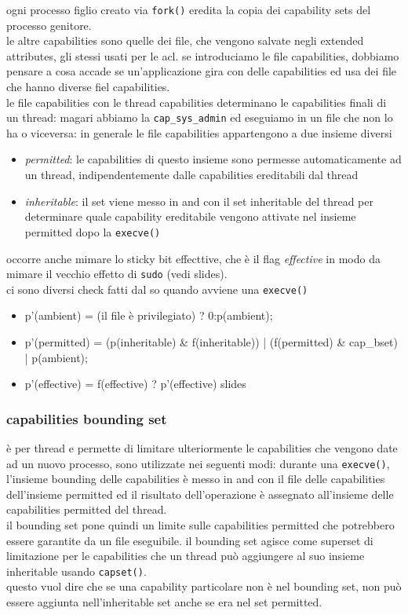 \documentclass[12pt, oneside]{extbook} %
\begin{document}
ogni processo figlio creato via \texttt{fork()} eredita la copia dei capability sets del processo genitore.\\le altre capabilities sono quelle dei file, che vengono salvate negli extended attributes, gli stessi usati per le acl. se introduciamo le file capabilities, dobbiamo pensare a cosa accade se un'applicazione gira con delle capabilities ed usa dei file che hanno diverse fiel capabilities.\\le file capabilities con le thread capabilities determinano le capabilities finali di un thread: magari abbiamo la \texttt{cap\_sys\_admin} ed eseguiamo in un file che non lo ha o viceversa: in generale le file capabilities appartengono a due insieme diversi
\begin{itemize}
\item \textit{permitted}: le capabilities di questo insieme sono permesse automaticamente ad un thread, indipendentemente dalle capabilities ereditabili dal thread
\item \textit{inheritable}: il set viene messo in and con il set inheritable del thread per determinare quale capability ereditabile vengono attivate nel insieme permitted dopo la \texttt{execve()}
\end{itemize}
occorre anche mimare lo sticky bit effecttive, che è il flag \textit{effective} in modo da mimare il vecchio effetto di \texttt{sudo} (vedi slides).\\ci sono diversi check fatti dal so quando avviene una \texttt{execve()}
\begin{itemize}
\item p'(ambient) = (il file è privilegiato) ? 0:p(ambient);
\item p'(permitted) = (p(inheritable) \& f(inheritable)) | (f(permitted) \& cap\_bset) | p(ambient);
\item p'(effective) = f(effective) ? p'(effective) slides
\end{itemize}

\subsubsection{capabilities bounding set} 
è per thread e permette di limitare ulteriormente le capabilities che vengono date ad un nuovo processo, sono utilizzate nei seguenti modi: durante una \texttt{execve()}, l'insieme bounding delle capabilities è messo in and con il file delle capabilities dell'insieme permitted ed il risultato dell'operazione è  assegnato all'insieme delle capabilities permitted del thread.\\il bounding set pone quindi un limite sulle capabilities permitted che potrebbero essere garantite da un file eseguibile. il bounding set agisce come superset di limitazione per le capabilities che un thread può aggiungere al suo insieme inheritable usando \texttt{capset()}.\\questo vuol dire che se una capability particolare non è  nel bounding set, non può essere aggiunta nell'inheritable set anche se era nel set permitted.
\end{document}
